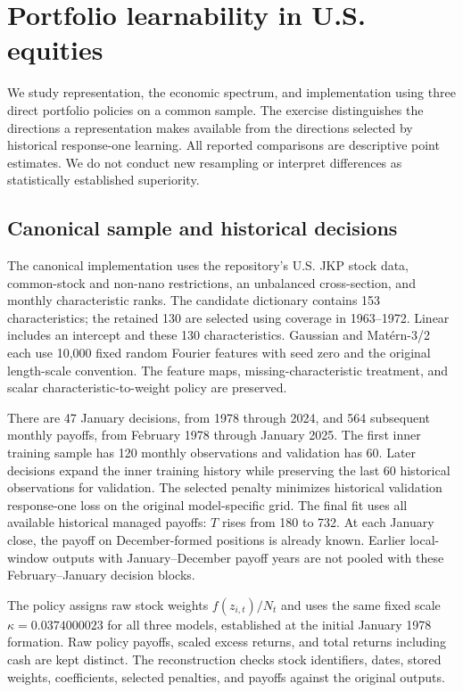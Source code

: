 \section{Portfolio learnability in U.S. equities}
\label{sec:real_empirics}

We study representation, the economic spectrum, and implementation using three direct portfolio policies on a common sample. The exercise distinguishes the directions a representation makes available from the directions selected by historical response-one learning. All reported comparisons are descriptive point estimates. We do not conduct new resampling or interpret differences as statistically established superiority.

\subsection{Canonical sample and historical decisions}

The canonical implementation uses the repository's U.S. JKP stock data, common-stock and non-nano restrictions, an unbalanced cross-section, and monthly characteristic ranks. The candidate dictionary contains 153 characteristics; the retained 130 are selected using coverage in 1963--1972. Linear includes an intercept and these 130 characteristics. Gaussian and Mat\'ern-3/2 each use 10,000 fixed random Fourier features with seed zero and the original length-scale convention. The feature maps, missing-characteristic treatment, and scalar characteristic-to-weight policy are preserved.

There are 47 January decisions, from 1978 through 2024, and 564 subsequent monthly payoffs, from February 1978 through January 2025. The first inner training sample has 120 monthly observations and validation has 60. Later decisions expand the inner training history while preserving the last 60 historical observations for validation. The selected penalty minimizes historical validation response-one loss on the original model-specific grid. The final fit uses all available historical managed payoffs: $T$ rises from 180 to 732. At each January close, the payoff on December-formed positions is already known. Earlier local-window outputs with January--December payoff years are not pooled with these February--January decision blocks.

The policy assigns raw stock weights $f(z_{i,t})/N_t$ and uses the same fixed scale $\kappa=0.0374000023$ for all three models, established at the initial January 1978 formation. Raw policy payoffs, scaled excess returns, and total returns including cash are kept distinct. The reconstruction checks stock identifiers, dates, stored weights, coefficients, selected penalties, and payoffs against the original outputs.

